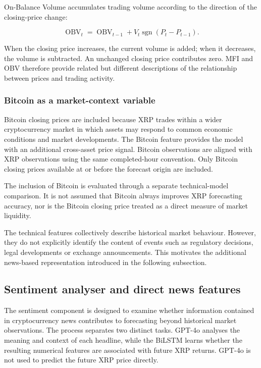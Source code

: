 On-Balance Volume accumulates trading volume according to the direction of the closing-price change:

\begin{equation}
\operatorname{OBV}_t
=
\operatorname{OBV}_{t-1}
+
V_t\operatorname{sgn}(P_t-P_{t-1}).
\label{eq:obv}
\end{equation}

When the closing price increases, the current volume is added; when it decreases, the volume is subtracted. An unchanged closing price contributes zero. MFI and OBV therefore provide related but different descriptions of the relationship between prices and trading activity.

\subsubsection{Bitcoin as a market-context variable}

Bitcoin closing prices are included because XRP trades within a wider cryptocurrency market in which assets may respond to common economic conditions and market developments. The Bitcoin feature provides the model with an additional cross-asset price signal. Bitcoin observations are aligned with XRP observations using the same completed-hour convention. Only Bitcoin closing prices available at or before the forecast origin are included.

The inclusion of Bitcoin is evaluated through a separate technical-model comparison. It is not assumed that Bitcoin always improves XRP forecasting accuracy, nor is the Bitcoin closing price treated as a direct measure of market liquidity.

The technical features collectively describe historical market behaviour. However, they do not explicitly identify the content of events such as regulatory decisions, legal developments or exchange announcements. This motivates the additional news-based representation introduced in the following subsection.

\subsection{Sentiment analyser and direct news features}
\label{sec:method_sentiment}

The sentiment component is designed to examine whether information contained in cryptocurrency news contributes to forecasting beyond historical market observations. The process separates two distinct tasks. GPT-4o analyses the meaning and context of each headline, while the BiLSTM learns whether the resulting numerical features are associated with future XRP returns. GPT-4o is not used to predict the future XRP price directly.

